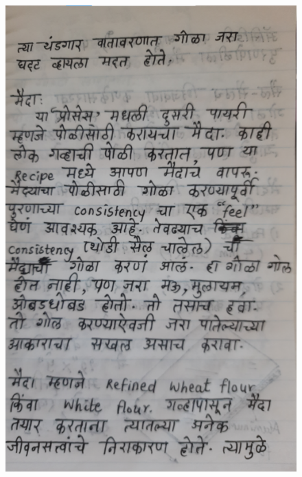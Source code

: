 \documentclass[17pt]{extarticle}  %
\begin{document}
\begin{figure}[h!]
    \centering
    \includegraphics{img/07-s.png}
\end{figure}
\end{document}
